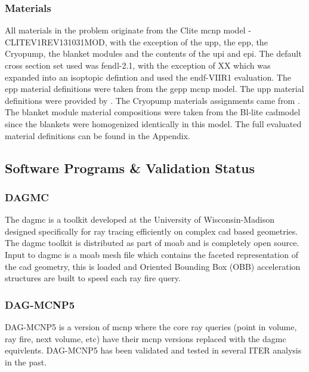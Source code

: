 \documentclass[12pt]{article}
\begin{document}
\newpage
\clearpage
\subsubsection{Materials}
All materials in the problem originate from the Clite \gls{mcnp} model -
CLITE\textunderscore V1\textunderscore REV131031\textunderscore MOD, with the
exception of the \gls{upp}, the \gls{epp}, the
Cryopump, the blanket modules and the contents of the \gls{upi} and \gls{epi}.
The default cross section set used was \gls{fendl}-2.1, with the exception of XX
which was expanded into an isoptopic defintion and used the \gls{endf}-VIIR1
evaluation. The \gls{epp} material definitions were taken from the \gls{gepp}
\gls{mcnp} model\cite{epp_materials}. The \gls{upp} material definitions were
provided by \cite{bertalot_communication}. The Cryopump materials assignments
came from \cite{cryopump_communication}. The blanket module material
compositions were taken from the Bl-lite \gls{cad}model since the blankets were
homogenized identically in this model. The full evaluated material definitions
can be found in the Appendix.
\newpage
\subsection{Software Programs \& Validation Status}
\subsubsection{DAGMC}
The \gls{dagmc} is a toolkit developed at the University of Wisconsin-Madison
designed specifically for ray tracing efficiently on complex \gls{cad} based
geometries. The \gls{dagmc} toolkit is distributed as part of \gls{moab} and
is completely open source. Input to \gls{dagmc} is a \gls{moab} mesh file
which contains the faceted representation of the \gls{cad} geometry, this
is loaded and Oriented Bounding Box (OBB) acceleration structures are built
to speed each ray fire query.
\subsubsection{DAG-MCNP5}
DAG-MCNP5 \cite{dagmc} is a version of \gls{mcnp} \cite{mcnp} where the core ray
queries (point in volume, ray fire, next volume, etc) have their \gls{mcnp}
versions replaced with the \gls{dagmc} equivlents. DAG-MCNP5 has been validated
\cite{dagmc_validation} and tested in several ITER analysis in the past.
\end{document}
